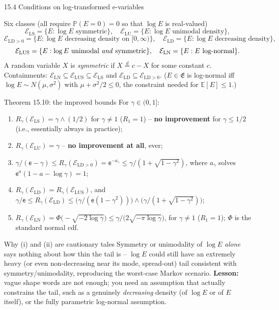 \documentclass[aspectratio=169,10pt]{beamer}
\newcommand{\PP}{\mathbb{P}}
\newcommand{\EE}{\mathbb{E}}
\newcommand{\frakE}{\mathfrak{E}}
\newcommand{\ELS}{\mathcal{E}_{\mathrm{LS}}}
\newcommand{\ELU}{\mathcal{E}_{\mathrm{LU}}}
\newcommand{\ELDzero}{\mathcal{E}_{\mathrm{LD}>0}}
\newcommand{\ELD}{\mathcal{E}_{\mathrm{LD}}}
\newcommand{\ELUS}{\mathcal{E}_{\mathrm{LUS}}}
\newcommand{\ELN}{\mathcal{E}_{\mathrm{LN}}}
\begin{document}
\begin{frame}[allowframebreaks]{15.4 Conditions on log-transformed e-variables}
  \begin{block}{Six classes (all require $\PP(E=0)=0$ so that $\log E$ is real-valued)}
    \[
      \ELS = \{E : \log E \text{ symmetric}\}, \quad
      \ELU = \{E : \log E \text{ unimodal density}\},
    \]
    \[
      \ELDzero = \{E : \log E \text{ decreasing density on } [0,\infty)\}, \quad
      \ELD = \{E : \log E \text{ decreasing density}\},
    \]
    \[
      \ELUS = \{E : \log E \text{ unimodal \emph{and} symmetric}\}, \quad
      \ELN = \{E : E \text{ log-normal}\}.
    \]
    A random variable $X$ is \emph{symmetric} if $X\stackrel{d}{=}c-X$ for some constant $c$. Containments: $\ELN\subseteq\ELUS\subseteq\ELS$ and $\ELD\subseteq\ELDzero$. ($E\in\frakE$ is log-normal iff $\log E\sim N(\mu,\sigma^2)$ with $\mu+\sigma^2/2\le0$, the constraint needed for $\EE[E]\le1$.)
  \end{block}

  \begin{block}{Theorem 15.10: the improved bounds}
    For $\gamma\in(0,1]$:
    \begin{enumerate}
      \item[(i)] $R_\gamma(\ELS)=\gamma\wedge(1/2)$ for $\gamma\ne1$ ($R_1=1$) -- \textbf{no improvement} for $\gamma\le1/2$ (i.e., essentially always in practice);
      \item[(ii)] $R_\gamma(\ELU)=\gamma$ -- \textbf{no improvement at all}, ever;
      \item[(iii)] $\gamma/(\mathsf{e}-\gamma) \le R_\gamma(\ELDzero) = \mathsf{e}^{-a_\gamma} \le \gamma/(1+\sqrt{1-\gamma^2})$, where $a_\gamma$ solves $\mathsf{e}^a(1-a-\log\gamma)=1$;
      \item[(iv)] $R_\gamma(\ELD)=R_\gamma(\ELUS)$, and $\gamma/\mathsf{e} \le R_\gamma(\ELD) \le \big(\gamma/(\mathsf{e}(1-\gamma^2))\big)\wedge\big(\gamma/(1+\sqrt{1-\gamma^2})\big)$;
      \item[(v)] $R_\gamma(\ELN) = \Phi\big(-\sqrt{-2\log\gamma}\big) \le \gamma/\big(2\sqrt{-\pi\log\gamma}\big)$, for $\gamma\ne1$ ($R_1=1$); $\Phi$ is the standard normal cdf.
    \end{enumerate}
  \end{block}

  \framebreak

  \begin{block}{Why (i) and (ii) are cautionary tales}
    Symmetry or unimodality of $\log E$ \emph{alone} says nothing about how thin the tail is -- $\log E$ could still have an extremely heavy (or even non-decreasing near its mode, spread-out) tail consistent with symmetry/unimodality, reproducing the worst-case Markov scenario. \textbf{Lesson:} vague shape words are not enough; you need an assumption that actually constrains the tail, such as a genuinely \emph{decreasing} density (of $\log E$ or of $E$ itself), or the fully parametric log-normal assumption.
  \end{block}


\end{frame}
\end{document}
